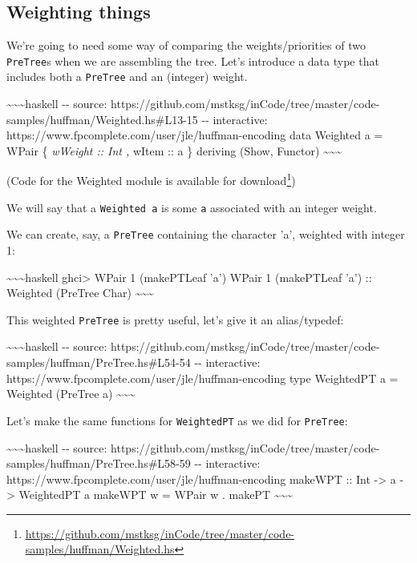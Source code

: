 \documentclass[]{article}
\renewcommand{\href}[2]{#2\footnote{\url{#1}}}
\begin{document}
\subsection{Weighting things}

We're going to need some way of comparing the weights/priorities of two
\texttt{PreTree}s when we are assembling the tree. Let's introduce a data type
that includes both a \texttt{PreTree} and an (integer) weight.

\textasciitilde{}\textasciitilde{}\textasciitilde{}haskell -\/- source:
https://github.com/mstksg/inCode/tree/master/code-samples/huffman/Weighted.hs\#L13-15
-\/- interactive: https://www.fpcomplete.com/user/jle/huffman-encoding data
Weighted a = WPair \{ \emph{wWeight :: Int , }wItem :: a \} deriving (Show,
Functor) \textasciitilde{}\textasciitilde{}\textasciitilde{}

(Code for the Weighted module is
\href{https://github.com/mstksg/inCode/tree/master/code-samples/huffman/Weighted.hs}{available
for download})

We will say that a \texttt{Weighted\ a} is some \texttt{a} associated with an
integer weight.

We can create, say, a \texttt{PreTree} containing the character 'a', weighted
with integer 1:

\textasciitilde{}\textasciitilde{}\textasciitilde{}haskell ghci\textgreater{}
WPair 1 (makePTLeaf 'a') WPair 1 (makePTLeaf 'a') :: Weighted (PreTree Char)
\textasciitilde{}\textasciitilde{}\textasciitilde{}

This weighted \texttt{PreTree} is pretty useful, let's give it an alias/typedef:

\textasciitilde{}\textasciitilde{}\textasciitilde{}haskell -\/- source:
https://github.com/mstksg/inCode/tree/master/code-samples/huffman/PreTree.hs\#L54-54
-\/- interactive: https://www.fpcomplete.com/user/jle/huffman-encoding type
WeightedPT a = Weighted (PreTree a)
\textasciitilde{}\textasciitilde{}\textasciitilde{}

Let's make the same functions for \texttt{WeightedPT} as we did for
\texttt{PreTree}:

\textasciitilde{}\textasciitilde{}\textasciitilde{}haskell -\/- source:
https://github.com/mstksg/inCode/tree/master/code-samples/huffman/PreTree.hs\#L58-59
-\/- interactive: https://www.fpcomplete.com/user/jle/huffman-encoding makeWPT
:: Int -\textgreater{} a -\textgreater{} WeightedPT a makeWPT w = WPair w .
makePT \textasciitilde{}\textasciitilde{}\textasciitilde{}
\end{document}

